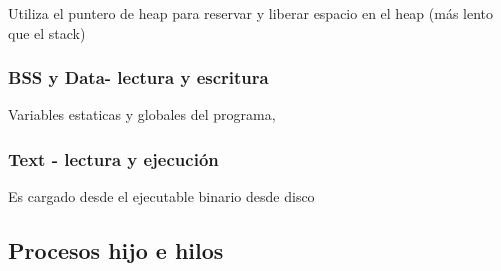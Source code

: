 Utiliza el puntero de heap para reservar y liberar espacio en el heap (más lento que el stack)

\subsubsection{BSS y Data- lectura y escritura}

Variables estaticas y globales del programa,

\subsubsection{Text - lectura y ejecución}

Es cargado desde el ejecutable binario desde disco


\subsection{Procesos hijo e hilos}





